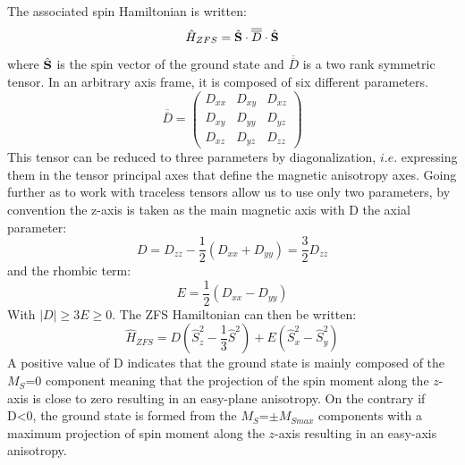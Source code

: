 \documentclass[12pt]{report}
\numberwithin{equation}{section}
\begin{document}
The associated spin Hamiltonian is written:
\begin{equation}\label{SDS}
    \hat{H}_{ZFS}=\hat{\vb S} \cdot \overline{\overline{D}} \cdot \hat{\vb S}
\end{equation}
where $\hat{\vb S}$ is the spin vector of the ground state and $\overline{\overline{D}}$ is a two rank symmetric tensor. In an arbitrary axis frame, it is composed of six different parameters.
\begin{equation}
    \overline{\overline{D}}=\begin{pmatrix}
        D_{xx} & D_{xy} & D_{xz}\\
        D_{xy} & D_{yy} & D_{yz}\\
        D_{xz} & D_{yz} & D_{zz}
    \end{pmatrix}
\end{equation}
This tensor can be reduced to three parameters by diagonalization, $\textit{i.e.}$ expressing them in the tensor principal axes that define the magnetic anisotropy axes.
Going further as to work with traceless tensors allow us to use only two parameters, by convention the z-axis is taken as the main magnetic axis with D the axial parameter:
\begin{equation}\label{ParametreD}
    D=D_{zz}-\frac{1}{2}(D_{xx}+D_{yy})=\frac{3}{2}D_{zz}
\end{equation}
and the rhombic term:
\begin{equation}\label{ParametreE}
    E=\frac{1}{2}(D_{xx}-D_{yy})
\end{equation}
With $|D| \geq 3E \geq 0$. 
The ZFS Hamiltonian can then be written:
\begin{equation}\label{HZFS}
    \hat{H}_{ZFS}=D (\hat{S}_z^2-\frac{1}{3}\hat{S}^2)+E(\hat{S}_x^2-\hat{S}_y^2)
\end{equation}
A positive value of D indicates that the ground state is mainly composed of the $M_S$=0 component meaning that the projection of the spin moment along the $z$-axis is close to zero resulting in an easy-plane anisotropy. 
On the contrary if D<0, the ground state is formed from the $M_S$=$\pm M_{Smax}$ components with a maximum projection of spin moment along the $z$-axis resulting in an easy-axis anisotropy.
\end{document}
